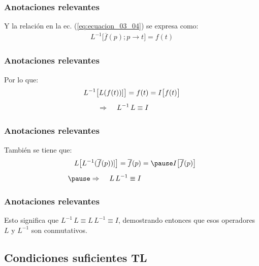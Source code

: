 \begin{frame}
\frametitle{Anotaciones relevantes}
Y la relación en la ec. (\ref{eq:ecuacion_03_04}) se expresa como:
\pause
\begin{align}
L^{-1} \big[ \overline{f}(p); p \to t  \big] = f (t)
\label{eq:ecuacion_03_06}
\end{align}
\end{frame}
\begin{frame}
\frametitle{Anotaciones relevantes}
Por lo que:
\pause
\begin{align*}
L^{-1} \big[ L(f (t))] \big] = f (t) &= I \big[ f (t) \big] \\[0.5em]
\Rightarrow \hspace{0.4cm} L^{-1} \, L \equiv I
\end{align*}
\end{frame}
\begin{frame}
\frametitle{Anotaciones relevantes}
También se tiene que:
\pause
\begin{eqnarray*}
\begin{aligned}
L \big[ L^{-1} (\overline{f}(p))] \big] = \overline{f}(p) &= \pause I \big[ \overline{f}(p) \big] \\[0.5em] \pause
\Rightarrow \hspace{0.4cm} L \, L^{-1} \equiv I
\end{aligned}
\end{eqnarray*}
\end{frame}
\begin{frame}
\frametitle{Anotaciones relevantes}
Esto significa que $L^{-1} \, L \equiv L \, L^{-1} \equiv I$, \pause demostrando entonces que esos operadores $L$ y $L^{-1}$ son conmutativos.
\end{frame}

\subsection{Condiciones suficientes TL}

